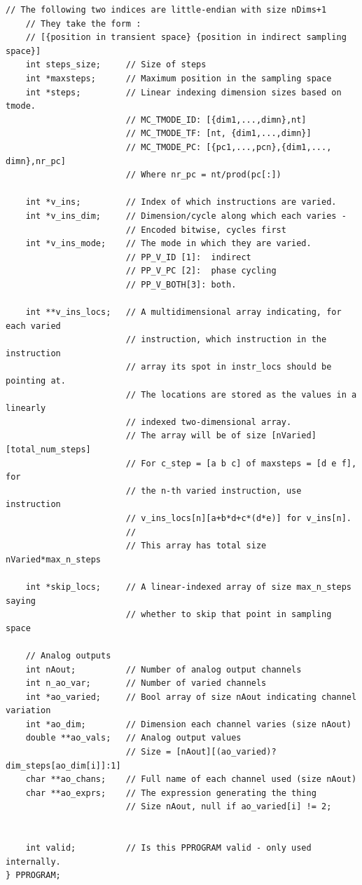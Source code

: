 \documentclass[PaulGanssle-Thesis.tex]{subfiles}
\begin{document}
\begin{lstlisting}[caption={The \texttt{PPROGRAM} structure used to store pulse programs.}, label={code:PPROG_struct}]
	// The following two indices are little-endian with size nDims+1
	// They take the form :
	// [{position in transient space} {position in indirect sampling space}]
	int steps_size;		// Size of steps
	int *maxsteps; 		// Maximum position in the sampling space
	int *steps;			// Linear indexing dimension sizes based on tmode.
						// MC_TMODE_ID: [{dim1,...,dimn},nt]
						// MC_TMODE_TF: [nt, {dim1,...,dimn}]
						// MC_TMODE_PC: [{pc1,...,pcn},{dim1,..., dimn},nr_pc]
						// Where nr_pc = nt/prod(pc[:])
	
	int *v_ins; 		// Index of which instructions are varied.
	int *v_ins_dim;		// Dimension/cycle along which each varies -
						// Encoded bitwise, cycles first
	int *v_ins_mode;	// The mode in which they are varied. 
						// PP_V_ID [1]:  indirect
						// PP_V_PC [2]:  phase cycling
						// PP_V_BOTH[3]: both.
	
	int **v_ins_locs; 	// A multidimensional array indicating, for each varied 
						// instruction, which instruction in the instruction 
						// array its spot in instr_locs should be pointing at.
						// The locations are stored as the values in a linearly
						// indexed two-dimensional array.
						// The array will be of size [nVaried][total_num_steps]
						// For c_step = [a b c] of maxsteps = [d e f], for 
						// the n-th varied instruction, use instruction 
						// v_ins_locs[n][a+b*d+c*(d*e)] for v_ins[n].
						//
						// This array has total size nVaried*max_n_steps
	
	int *skip_locs;		// A linear-indexed array of size max_n_steps saying 
						// whether to skip that point in sampling space				
	
	// Analog outputs
	int nAout;			// Number of analog output channels
	int n_ao_var;		// Number of varied channels
	int *ao_varied;		// Bool array of size nAout indicating channel variation
	int *ao_dim;		// Dimension each channel varies (size nAout)
	double **ao_vals;	// Analog output values
						// Size = [nAout][(ao_varied)?dim_steps[ao_dim[i]]:1]
	char **ao_chans;	// Full name of each channel used (size nAout)
	char **ao_exprs;	// The expression generating the thing	
						// Size nAout, null if ao_varied[i] != 2;
	
		
	int valid;			// Is this PPROGRAM valid - only used internally.
} PPROGRAM;
\end{lstlisting}
\end{document}
